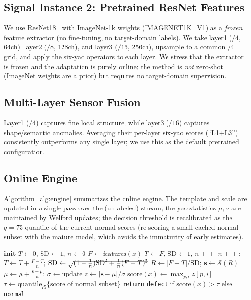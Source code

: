 \documentclass[journal,10pt]{IEEEtran}
\begin{document}
\subsection{Signal Instance 2: Pretrained ResNet Features}
We use ResNet18~\cite{he2016resnet} with ImageNet-1k weights
(IMAGENET1K\_V1) as a \emph{frozen} feature extractor (no fine-tuning, no
target-domain labels). We take layer1 ($/4$, 64ch), layer2 ($/8$, 128ch),
and layer3 ($/16$, 256ch), upsample to a common $/4$ grid, and apply the
six-yao operators to each layer. We stress that the extractor is frozen
and the adaptation is purely online; the method is \emph{not} zero-shot
(ImageNet weights are a prior) but requires no target-domain supervision.

\subsection{Multi-Layer Sensor Fusion}
Layer1 ($/4$) captures fine local structure, while layer3 ($/16$)
captures shape/semantic anomalies. Averaging their per-layer six-yao
scores (``L1+L3'') consistently outperforms any single layer; we use this
as the default pretrained configuration.

\subsection{Online Engine}
Algorithm~\ref{alg:engine} summarizes the online engine. The template and
scale are updated in a single pass over the (unlabeled) stream; the yao
statistics $\mu,\sigma$ are maintained by Welford updates; the decision
threshold is recalibrated as the $q{=}75$ quantile of the current normal
scores (re-scoring a small cached normal subset with the mature model,
which avoids the immaturity of early estimates).

\begin{algorithm}[t]
\caption{Online six-yao anomaly engine}
\label{alg:engine}
\begin{algorithmic}[1]
\State \textbf{init} $T\!\leftarrow\!0$, $\mathrm{SD}\!\leftarrow\!1$,
       $n\!\leftarrow\!0$
    \State $F\leftarrow\mathrm{features}(x)$
     $T\leftarrow F$, $\mathrm{SD}\leftarrow 1$, $n\!+\!+$
    \Else
        \State $n\!+\!+$;
               $T\leftarrow T+\frac{F-T}{n}$;
               $\mathrm{SD}\leftarrow\sqrt{\smash{(1-\tfrac1n)\mathrm{SD}^2+\tfrac1n(F-T)^2}}$
    \EndIf
    \State $R\leftarrow|F-T|/\mathrm{SD}$;
           $\mathbf{s}\leftarrow\mathcal{S}(R)$
    \State $\mu\leftarrow\mu+\frac{\mathbf{s}-\mu}{n}$;
           $\sigma\leftarrow\mathrm{update}$ 
    \State $z\leftarrow|\mathbf{s}-\mu|/\sigma$
    \State $\mathrm{score}(x)\leftarrow\max_{p,i} z[p,i]$
    \State $\tau\leftarrow\mathrm{quantile}_{75}\{\mathrm{score}\text{ of normal subset}\}$
    \State \textbf{return} \texttt{defect} if $\mathrm{score}(x)>\tau$ else \texttt{normal}
\EndFor
\end{algorithmic}
\end{algorithm}
\end{document}
